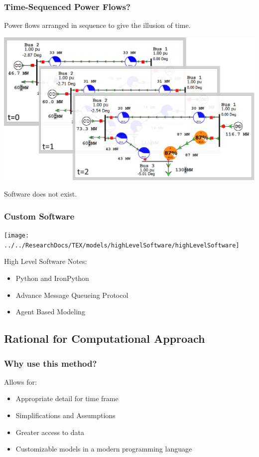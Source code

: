 \documentclass[14pt, unknownkeysallowed]{beamer}
\begin{document}
\begin{frame}
\frametitle{Time-Sequenced Power Flows?}
Power flows arranged in sequence to give the illusion of time.\\
\begin{center}
	\includegraphics[width=.6\linewidth]{powerFlowSequence}
\end{center}
Software does not exist.
\end{frame}
\begin{frame}
\frametitle{Custom Software}
\begin{center}
	\texttt{[image: ../../ResearchDocs/TEX/models/highLevelSoftware/highLevelSoftware]}
\end{center}

High Level Software Notes:\\
\begin{itemize}
	\item Python and IronPython
	\item Advance Message Queueing Protocol
	\item Agent Based Modeling
\end{itemize}



\end{frame}
\subsection{Rational for Computational Approach}
\begin{frame}
\frametitle{Why use this method?}
Allows for:
\begin{itemize}
\item Appropriate detail for time frame
\item Simplifications and Assumptions
\item Greater access to data
\item Customizable models in a modern programming language
\end{itemize}
\end{frame}
\end{document}
